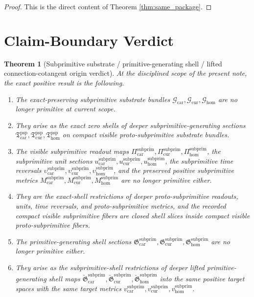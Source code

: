 \documentclass[11pt]{article}
\newcommand{\Car}{\mathrm{car}}
\newcommand{\Cur}{\mathrm{cur}}
\newcommand{\Hom}{\mathrm{hom}}
\newcommand{\SubprimTargetMetric}[1]{v_{#1}^{\mathrm{subprim}}}
\newcommand{\SubprimSpace}[1]{\mathcal G_{#1}}
\newcommand{\SubprimRead}[1]{\Pi_{#1}^{\mathrm{subprim}}}
\newcommand{\SubprimUnit}[1]{u_{#1}^{\mathrm{subprim}}}
\newcommand{\SubprimTimeRev}[1]{\upsilon_{#1}^{\mathrm{subprim}}}
\newcommand{\SubprimMetric}[1]{M_{#1}^{\mathrm{subprim}}}
\newcommand{\SubprimSection}[1]{\mathfrak G_{#1}^{\mathrm{subprim}}}
\newcommand{\ProtoSubprimSection}[1]{\mathfrak T_{#1}^{\mathrm{psp}}}
\newcommand{\ProtoSubprimLiftedPrimitive}[1]{\check{\mathfrak G}_{#1}^{\mathrm{subprim}}}
\newtheorem{theorem}{Theorem}
\begin{document}
\begin{proof}
This is the direct content of Theorem \ref{thm:same_package}.
\end{proof}

\section{Claim-Boundary Verdict}

\begin{theorem}[Subprimitive substrate / primitive-generating shell / lifted connection-cotangent origin verdict]
\label{thm:verdict}
At the disciplined scope of the present note, the exact positive result is the following.
\begin{enumerate}
    \item The exact-preserving subprimitive substrate bundles \(\SubprimSpace{\Car},\SubprimSpace{\Cur},\SubprimSpace{\Hom}\) are no longer primitive at current scope.
    \item They arise as the exact zero shells of deeper subprimitive-generating sections \(\ProtoSubprimSection{\Car},\ProtoSubprimSection{\Cur},\ProtoSubprimSection{\Hom}\) on compact visible proto-subprimitive substrate bundles.
    \item The visible subprimitive readout maps \(\SubprimRead{\Car},\SubprimRead{\Cur},\SubprimRead{\Hom}\), the subprimitive unit sections \(\SubprimUnit{\Car},\SubprimUnit{\Cur},\SubprimUnit{\Hom}\), the subprimitive time reversals \(\SubprimTimeRev{\Car},\SubprimTimeRev{\Cur},\SubprimTimeRev{\Hom}\), and the preserved positive subprimitive metrics \(\SubprimMetric{\Car},\SubprimMetric{\Cur},\SubprimMetric{\Hom}\) are no longer primitive either.
    \item They are the exact-shell restrictions of deeper proto-subprimitive readouts, units, time reversals, and proto-subprimitive metrics, and the recorded compact visible subprimitive fibers are closed shell slices inside compact visible proto-subprimitive fibers.
    \item The primitive-generating shell sections \(\SubprimSection{\Car},\SubprimSection{\Cur},\SubprimSection{\Hom}\) are no longer primitive either.
    \item They arise as the subprimitive-shell restrictions of deeper lifted primitive-generating shell maps \(\ProtoSubprimLiftedPrimitive{\Car},\ProtoSubprimLiftedPrimitive{\Cur},\ProtoSubprimLiftedPrimitive{\Hom}\) into the same positive target spaces with the same target metrics \(\SubprimTargetMetric{\Car},\SubprimTargetMetric{\Cur},\SubprimTargetMetric{\Hom}\).

\end{enumerate}
\end{theorem}
\end{document}
